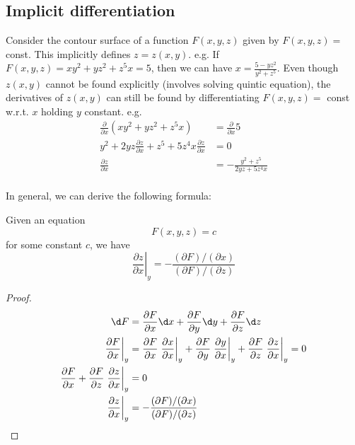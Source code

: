 \documentclass[a4paper]{article}
\begin{document}
\subsection{Implicit differentiation}
Consider the contour surface of a function $F(x, y, z)$ given by $F(x, y, z) = $ const. This implicitly defines $z = z(x, y)$. e.g. If $F(x, y, z) = xy^2 + yz^2 + z^5x = 5$, then we can have $x = \frac{5 - yz^2}{y^2 + z^5}$. Even though $z(x, y)$ cannot be found explicitly (involves solving quintic equation), the derivatives of $z(x, y)$ can still be found by differentiating $F(x, y, z) =$ const w.r.t. $x$ holding $y$ constant. e.g.
\begin{align*}
  \frac{\partial }{\partial x}(xy^2 + yz^2 + z^5x) &= \frac{\partial }{\partial x}5\\
  y^2 + 2yz\frac{\partial z}{\partial x} + z^5 + 5z^4x\frac{\partial z}{\partial x} &= 0\\
  \frac{\partial z}{\partial x} &= -\frac{y^2 + z^5}{2yz + 5z^4x}\\
\end{align*}

In general, we can derive the following formula:
\begin{thm} Given an equation 
  \[
  F(x, y, z) = c
  \]
  for some constant $c$, we have
  \[
  \left.\frac{\partial z}{\partial x}\right|_y = -\frac{(\partial F)/(\partial x)}{(\partial F)/(\partial z)}
  \]
\end{thm}

\begin{proof}
  \begin{align*}
  \d F &= \frac{\partial F}{\partial x}\d x + \frac{\partial F}{\partial y}\d y + \frac{\partial F}{\partial z}\d z\\
  \left.\frac{\partial F}{\partial x}\right|_y &= \frac{\partial F}{\partial x}\left.\frac{\partial x}{\partial x}\right|_y + \frac{\partial F}{\partial y}\left.\frac{\partial y}{\partial x}\right|_y + \frac{\partial F}{\partial z}\left.\frac{\partial z}{\partial x}\right|_y = 0\\
  \frac{\partial F}{\partial x} + \frac{\partial F}{\partial z}\left.\frac{\partial z}{\partial x}\right|_y &= 0\\
  \left.\frac{\partial z}{\partial x}\right|_y &= -\frac{(\partial F)/(\partial x)}{(\partial F)/(\partial z)}
\end{align*}
\end{proof}
\end{document}
